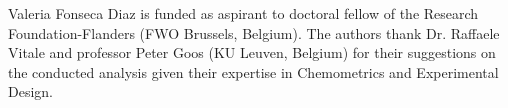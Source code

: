 \documentclass[journal=ancham,manuscript=article]{achemso}
\begin{document}

\begin{acknowledgement}

Valeria Fonseca Diaz is funded as aspirant to doctoral fellow of
the Research Foundation-Flanders (FWO Brussels, Belgium).
The authors thank Dr. Raffaele Vitale and professor Peter Goos (KU Leuven, Belgium) for their suggestions on the conducted analysis given their expertise in Chemometrics and Experimental Design. 
\end{acknowledgement}





\end{document}
